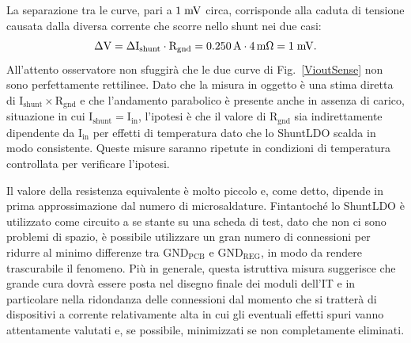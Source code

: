 La separazione tra le curve, pari a $1\rm \; mV$ circa, corrisponde alla caduta di tensione causata dalla diversa corrente che scorre nello shunt nei due casi:
\begin{equation}
\mathrm{\Delta V = \Delta I_{shunt} \cdot R_{gnd} = 0.250\rm \, A \cdot 4{\rm \, m\Omega} = 1\rm \; mV}.
\end{equation}
All'attento osservatore non sfuggir\`a che le due curve di Fig.~\ref{VioutSense} non sono perfettamente rettilinee. Dato che la misura in oggetto \`e una stima diretta di $\mathrm{I_{shunt}\times R_{gnd}}$ e che l'andamento parabolico \`e presente anche in assenza di carico, situazione in cui $\mathrm{I_{shunt}=I_{in}}$, l'ipotesi \`e che il valore di $\mathrm{R_{gnd}}$ sia indirettamente dipendente da $\mathrm{I_{in}}$ per effetti di temperatura dato che lo ShuntLDO scalda in modo consistente. Queste misure saranno ripetute in condizioni di temperatura controllata per verificare l'ipotesi.

%

Il valore della resistenza equivalente è molto piccolo e, come detto, dipende in prima approssimazione dal numero di microsaldature.
Fintantoché lo ShuntLDO è utilizzato come circuito a se stante su una scheda di test, dato che non ci sono problemi di spazio, è possibile utilizzare un gran numero di connessioni per ridurre al minimo differenze tra $\mathrm{GND_{PCB}}$ e $\mathrm{GND_{REG}}$, in modo da rendere trascurabile il fenomeno. 
Pi\`u in generale, questa istruttiva misura suggerisce che grande cura dovr\`a essere posta nel disegno finale dei moduli dell'IT e in particolare nella ridondanza delle connessioni dal momento che si tratter\`a di dispositivi a corrente relativamente alta in cui gli eventuali effetti spuri vanno attentamente valutati e, se possibile, minimizzati se non completamente eliminati.

